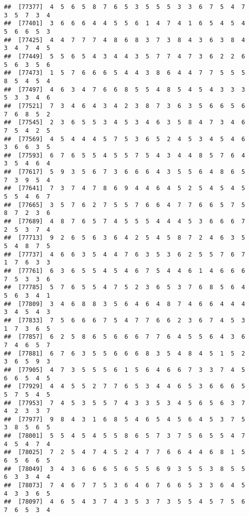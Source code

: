\documentclass[
]{book}
\begin{document}
\begin{verbatim}
##  [77377]  4  5  6  5  8  7  6  5  3  5  5  5  3  3  6  7  5  4  7  3  5  7  3  4
##  [77401]  3  6  6  6  4  4  5  5  6  1  4  7  4  1  6  5  4  5  4  5  6  6  5  3
##  [77425]  4  4  7  7  7  4  8  6  8  3  7  3  8  4  3  6  3  8  4  3  4  7  4  5
##  [77449]  5  5  6  5  4  3  4  4  3  5  7  7  4  7  3  6  2  2  6  5  6  3  5  6
##  [77473]  1  5  7  6  6  6  5  4  4  3  8  6  4  4  7  7  5  5  5  8  5  4  5  4
##  [77497]  4  6  3  4  7  6  6  8  5  5  4  8  5  4  5  4  3  3  3  5  3  3  4  6
##  [77521]  7  3  4  6  4  3  4  2  3  8  7  3  6  3  5  6  6  5  6  7  6  8  5  2
##  [77545]  2  3  6  5  5  3  4  5  3  4  6  3  5  8  4  7  3  4  6  7  5  4  2  5
##  [77569]  4  5  4  4  4  5  7  5  3  6  5  2  4  5  3  4  5  4  6  3  6  6  3  5
##  [77593]  6  7  6  5  5  4  5  5  7  5  4  3  4  4  8  5  7  6  4  3  5  4  6  4
##  [77617]  5  9  3  5  6  7  3  6  6  6  4  3  5  5  6  4  8  6  5  7  3  9  5  4
##  [77641]  7  3  7  4  7  8  6  9  4  4  6  4  5  2  5  4  5  4  5  5  5  4  6  7
##  [77665]  3  5  7  6  2  7  5  5  7  6  6  4  7  7  6  6  5  7  5  8  7  2  3  6
##  [77689]  4  8  7  6  5  7  4  5  5  5  4  4  4  5  3  6  6  6  7  2  5  3  7  4
##  [77713]  9  2  6  5  6  3  6  4  2  5  4  5  8  7  2  4  6  3  5  5  4  8  7  5
##  [77737]  4  6  6  3  5  4  4  7  6  3  5  3  6  2  5  5  7  6  7  1  7  6  3  3
##  [77761]  6  3  6  5  5  4  5  4  6  7  5  4  4  6  1  4  6  6  6  7  5  3  3  6
##  [77785]  5  7  6  5  5  4  7  5  2  3  6  5  3  7  6  8  5  6  4  5  6  3  4  1
##  [77809]  3  4  6  8  8  3  5  6  4  6  4  8  7  4  6  6  4  4  4  3  4  5  4  3
##  [77833]  7  5  6  6  6  7  5  4  7  7  6  6  2  3  6  7  4  5  3  1  7  3  6  5
##  [77857]  6  2  5  8  6  5  6  6  6  7  7  6  4  5  5  6  4  3  6  7  4  6  5  7
##  [77881]  6  7  6  3  5  5  6  6  6  8  3  5  4  8  4  5  1  5  2  3  6  5  9  3
##  [77905]  4  7  3  5  5  5  6  1  5  6  4  6  6  7  3  3  7  4  5  6  6  5  4  5
##  [77929]  4  4  5  5  2  7  7  6  5  3  4  4  6  5  3  6  6  6  5  5  7  5  4  5
##  [77953]  7  4  5  3  5  5  7  4  3  3  5  3  4  5  6  5  6  3  7  4  2  3  3  7
##  [77977]  9  8  4  3  1  6  8  5  4  6  5  4  5  6  4  5  3  7  5  3  8  5  6  5
##  [78001]  5  5  4  5  4  5  5  8  6  5  7  3  7  5  6  5  5  4  7  4  5  4  7  4
##  [78025]  7  2  5  4  7  4  5  2  4  7  7  6  6  4  4  6  8  1  5  6  5  6  6  5
##  [78049]  3  4  3  6  6  6  5  6  5  5  6  9  3  5  5  3  8  5  5  6  3  3  4  4
##  [78073]  7  4  6  7  7  5  3  6  4  6  7  6  6  5  3  3  6  4  5  4  3  3  6  5
##  [78097]  4  6  5  4  3  7  4  3  5  3  7  3  5  5  4  5  7  5  6  7  6  5  3  4

\end{verbatim}
\end{document}

